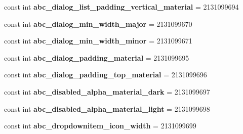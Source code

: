 \begin{DoxyCompactItemize}
const int {\bfseries abc\+\_\+dialog\+\_\+list\+\_\+padding\+\_\+vertical\+\_\+material} = 2131099694
\item 
\mbox{\label{class_sample_app_1_1_droid_1_1_resource_1_1_dimension_a012d84eedf6bbae93b26d28946cfa87a}} 
const int {\bfseries abc\+\_\+dialog\+\_\+min\+\_\+width\+\_\+major} = 2131099670
\item 
\mbox{\label{class_sample_app_1_1_droid_1_1_resource_1_1_dimension_adce1f32c3ffce4e802654cac3cfb1502}} 
const int {\bfseries abc\+\_\+dialog\+\_\+min\+\_\+width\+\_\+minor} = 2131099671
\item 
\mbox{\label{class_sample_app_1_1_droid_1_1_resource_1_1_dimension_a5e96e5cda2653f58c3042f74982190c2}} 
const int {\bfseries abc\+\_\+dialog\+\_\+padding\+\_\+material} = 2131099695
\item 
\mbox{\label{class_sample_app_1_1_droid_1_1_resource_1_1_dimension_af1f38785724c4634bbde6b9748792194}} 
const int {\bfseries abc\+\_\+dialog\+\_\+padding\+\_\+top\+\_\+material} = 2131099696
\item 
\mbox{\label{class_sample_app_1_1_droid_1_1_resource_1_1_dimension_a2cc4e4f4c2ace1c2116392e312ca7e35}} 
const int {\bfseries abc\+\_\+disabled\+\_\+alpha\+\_\+material\+\_\+dark} = 2131099697
\item 
\mbox{\label{class_sample_app_1_1_droid_1_1_resource_1_1_dimension_ac99d3cac679ded1034fb9ff3029e785a}} 
const int {\bfseries abc\+\_\+disabled\+\_\+alpha\+\_\+material\+\_\+light} = 2131099698
\item 
\mbox{\label{class_sample_app_1_1_droid_1_1_resource_1_1_dimension_affd49ff761dc044c8855addb68d1f5d5}} 
const int {\bfseries abc\+\_\+dropdownitem\+\_\+icon\+\_\+width} = 2131099699
\item 
\mbox{\label{class_sample_app_1_1_droid_1_1_resource_1_1_dimension_afcbeace66dfba82e6f1bba891955deaf}} 

\end{DoxyCompactItemize}
